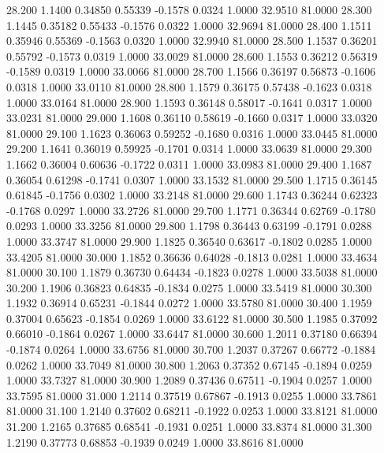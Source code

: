   28.200   1.1400   0.34850   0.55339  -0.1578   0.0324   1.0000  32.9510  81.0000
  28.300   1.1445   0.35182   0.55433  -0.1576   0.0322   1.0000  32.9694  81.0000
  28.400   1.1511   0.35946   0.55369  -0.1563   0.0320   1.0000  32.9940  81.0000
  28.500   1.1537   0.36201   0.55792  -0.1573   0.0319   1.0000  33.0029  81.0000
  28.600   1.1553   0.36212   0.56319  -0.1589   0.0319   1.0000  33.0066  81.0000
  28.700   1.1566   0.36197   0.56873  -0.1606   0.0318   1.0000  33.0110  81.0000
  28.800   1.1579   0.36175   0.57438  -0.1623   0.0318   1.0000  33.0164  81.0000
  28.900   1.1593   0.36148   0.58017  -0.1641   0.0317   1.0000  33.0231  81.0000
  29.000   1.1608   0.36110   0.58619  -0.1660   0.0317   1.0000  33.0320  81.0000
  29.100   1.1623   0.36063   0.59252  -0.1680   0.0316   1.0000  33.0445  81.0000
  29.200   1.1641   0.36019   0.59925  -0.1701   0.0314   1.0000  33.0639  81.0000
  29.300   1.1662   0.36004   0.60636  -0.1722   0.0311   1.0000  33.0983  81.0000
  29.400   1.1687   0.36054   0.61298  -0.1741   0.0307   1.0000  33.1532  81.0000
  29.500   1.1715   0.36145   0.61845  -0.1756   0.0302   1.0000  33.2148  81.0000
  29.600   1.1743   0.36244   0.62323  -0.1768   0.0297   1.0000  33.2726  81.0000
  29.700   1.1771   0.36344   0.62769  -0.1780   0.0293   1.0000  33.3256  81.0000
  29.800   1.1798   0.36443   0.63199  -0.1791   0.0288   1.0000  33.3747  81.0000
  29.900   1.1825   0.36540   0.63617  -0.1802   0.0285   1.0000  33.4205  81.0000
  30.000   1.1852   0.36636   0.64028  -0.1813   0.0281   1.0000  33.4634  81.0000
  30.100   1.1879   0.36730   0.64434  -0.1823   0.0278   1.0000  33.5038  81.0000
  30.200   1.1906   0.36823   0.64835  -0.1834   0.0275   1.0000  33.5419  81.0000
  30.300   1.1932   0.36914   0.65231  -0.1844   0.0272   1.0000  33.5780  81.0000
  30.400   1.1959   0.37004   0.65623  -0.1854   0.0269   1.0000  33.6122  81.0000
  30.500   1.1985   0.37092   0.66010  -0.1864   0.0267   1.0000  33.6447  81.0000
  30.600   1.2011   0.37180   0.66394  -0.1874   0.0264   1.0000  33.6756  81.0000
  30.700   1.2037   0.37267   0.66772  -0.1884   0.0262   1.0000  33.7049  81.0000
  30.800   1.2063   0.37352   0.67145  -0.1894   0.0259   1.0000  33.7327  81.0000
  30.900   1.2089   0.37436   0.67511  -0.1904   0.0257   1.0000  33.7595  81.0000
  31.000   1.2114   0.37519   0.67867  -0.1913   0.0255   1.0000  33.7861  81.0000
  31.100   1.2140   0.37602   0.68211  -0.1922   0.0253   1.0000  33.8121  81.0000
  31.200   1.2165   0.37685   0.68541  -0.1931   0.0251   1.0000  33.8374  81.0000
  31.300   1.2190   0.37773   0.68853  -0.1939   0.0249   1.0000  33.8616  81.0000
